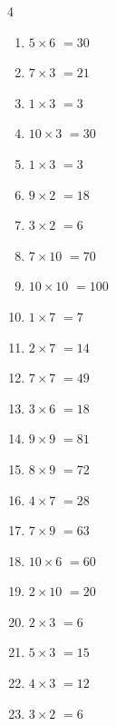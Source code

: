 \begin{multicols}{4}
\begin{enumerate}
  \item $5\times 6$
        $=30$

  \item $7\times 3$
        $=21$

  \item $1\times 3$
        $=3$

  \item $10\times 3$
        $=30$

  \item $1\times 3$
        $=3$

  \item $9\times 2$
        $=18$

  \item $3\times 2$
        $=6$

  \item $7\times 10$
        $=70$

  \item $10\times 10$
        $=100$

  \item $1\times 7$
        $=7$

  \item $2\times 7$
        $=14$

  \item $7\times 7$
        $=49$

  \item $3\times 6$
        $=18$

  \item $9\times 9$
        $=81$

  \item $8\times 9$
        $=72$

  \item $4\times 7$
        $=28$

  \item $7\times 9$
        $=63$

  \item $10\times 6$
        $=60$

  \item $2\times 10$
        $=20$

  \item $2\times 3$
        $=6$

  \item $5\times 3$
        $=15$

  \item $4\times 3$
        $=12$

  \item $3\times 2$
        $=6$


\end{enumerate}
\end{multicols}
